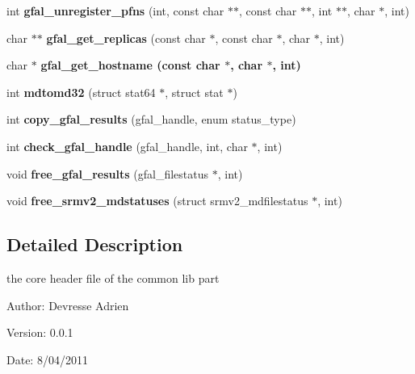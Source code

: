 \begin{CompactItemize}
\item 
int \textbf{gfal\_\-unregister\_\-pfns} (int, const char $\ast$$\ast$, const char $\ast$$\ast$, int $\ast$$\ast$, char $\ast$, int)\label{group__internal__group_g70f889fa2436723fb7b3cff20b661f21}

\item 
char $\ast$$\ast$ \textbf{gfal\_\-get\_\-replicas} (const char $\ast$, const char $\ast$, char $\ast$, int)\label{group__internal__group_gbd0a581309f65e07a5e28d442f07b169}

\item 
char $\ast$ \bf{gfal\_\-get\_\-hostname} (const char $\ast$, char $\ast$, int)
\item 
int \textbf{mdtomd32} (struct stat64 $\ast$, struct stat $\ast$)\label{gfal__common_8h_279a394776e983460b0dc373238bbdeb}

\item 
int \textbf{copy\_\-gfal\_\-results} (gfal\_\-handle, enum status\_\-type)\label{gfal__common_8h_226eb7c7688af01a84b243e831f4af77}

\item 
int \textbf{check\_\-gfal\_\-handle} (gfal\_\-handle, int, char $\ast$, int)\label{gfal__common_8h_74b7456978e7b4059473733755d71b85}

\item 
void \textbf{free\_\-gfal\_\-results} (gfal\_\-filestatus $\ast$, int)\label{gfal__common_8h_912fe2b722650ab952e78a8c44e28660}

\item 
void \textbf{free\_\-srmv2\_\-mdstatuses} (struct srmv2\_\-mdfilestatus $\ast$, int)\label{gfal__common_8h_00141b129093611da15bab0cee7fc196}

\end{CompactItemize}


\subsection{Detailed Description}
the core header file of the common lib part 

\begin{Desc}
\item[Author:]Devresse Adrien \end{Desc}
\begin{Desc}
\item[Version:]0.0.1 \end{Desc}
\begin{Desc}
\item[Date:]8/04/2011 \end{Desc}


